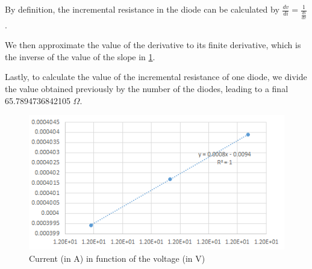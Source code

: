 By definition, the incremental resistance in the diode can be calculated by $\frac{dv}{di} = \frac{1}{\frac{di}{dv}}$.

We then approximate the value of the derivative to its finite derivative, which is the inverse of the value of the slope in \ref{fig:Rd}.

Lastly, to calculate the value of the incremental resistance of one diode, we divide the value obtained previously by the number of the diodes, leading to a final 65.7894736842105 $\Omega$.




\begin{figure}[!htb]
    \centering
      \includegraphics[width=.6\columnwidth]{Rd.png}
      \caption{Current (in A) in function of the voltage (in V)}
      \label{fig:Rd}
\end{figure}
